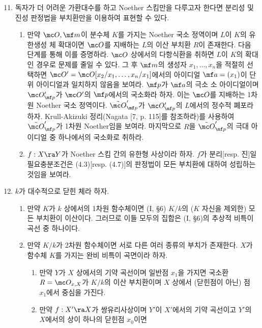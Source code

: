	\begin{enumerate}[label=\tb{4.\arabic*.},itemindent=0mm,itemsep=2mm]
	\setcounter{enumi}{10}
	\item 독자가 더 어려운 가환대수를 하고 Noether 스킴만을 다루고자 한다면
	분리성 및 진성 판정법을  부치환만을 이용하여 표현할 수 있다.
	\begin{enumerate}[label=(\alph*)]
	\item 만약 $\mc O,\mf m$이 분수체 $K$를 가지는 Noether 국소 정역이며 $L$이 $K$의 유한생성 체 확대이면
	$\mc O$를 지배하는 $L$의 이산 부치환 $R$이 존재한다. 다음 단계를 통해 이를 증명하라.
	$\mc O$ 상에서의 다항식환을 취하면 $L$이 $K$의  확대인 경우로 문제를 줄일 수 있다.
	그 후 $\mf m$의 생성자 $x_1,\ldots,x_n$을 적절히 선택하면
	$\mc O'=\mc O[x_2/x_1,\ldots,x_n/x_1]$에서의 아이디얼 $\mf a=(x_1)$이 단위 아이디얼과 일치하지 않음을 보여라.
	$\mf p$가 $\mf a$의 극소 소 아이디얼이며 $\mc O'_{\mf p}$가 $\mc O'$의 $\mf p$에서의 국소화라 하자.
	이는 $\mc O$를 지배하는 1차원 Noether 국소 정역이다. $\tilde{\mc O}'_{\mf p}$가 $\mc O'_{\mf p}$의 $L$에서의 정수적 폐포라 하자.
	Krull-Akizuki 정리(Nagata [7, p. 115]를 참조하라)를 사용하여 $\tilde{\mc O}'_{\mf p}$가 1차원 Noether임을 보여라.
	마지막으로 $R$을 $\tilde{\mc O}'_{\mf p}$의 극대 아이디얼 중 하나에서의 국소화로 취하라.
	\item $f:X\ra Y$가 Noether 스킴 간의 유한형 사상이라 하자. $f$가 분리[resp. 진]일 필요충분조건은
	(4.3)[resp. (4.7)]의 판정법이 모든  부치환에 대하여 성립하는 것임을 보여라.
	\end{enumerate}
	\item {} $k$가 대수적으로 닫힌 체라 하자.
	\begin{enumerate}[label=(\alph*)]
	\item 만약 $K$가 $k$ 상에서의 1차원 함수체이면 (I, \S 6) $K/k$의 ($K$ 자신을 제외한) 모든 부치환이 이산이다.
	그러므로 이들 모두의 집합은 (I, \S 6)의 추상적 비특이 곡선 중 하나이다.
	\item 만약 $K/k$가 2차원 함수체이면 서로 다른 여러 종류의 부치가 존재한다. $X$가 함수체 $K$를 가지는 완비 비특이 곡면이라 하자.
	\begin{enumerate}[label=(\arabic*)]
	\item 만약 $Y$가 $X$ 상에서의 기약 곡선이며 일반점 $x_1$을 가지면 국소환 $R=\mc O_{x,X}$가 $K/k$의 이산 부치환이며
	$X$ 상에서 (닫힌점이 아닌) 점 $x_1$에서 중심을 가진다.
	\item 만약 $f:X'\ra X$가 쌍유리사상이며 $Y'$이 $X'$에서의 기약 곡선이고 $Y'$의 $X$에서의 상이 하나의 닫힌점 $x_0$이면

\end{enumerate}
\end{enumerate}
\end{enumerate}
